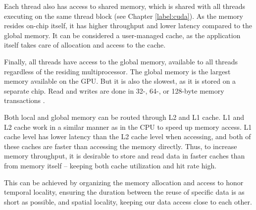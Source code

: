 Each thread also has access to shared memory, which is shared with all threads executing on the same thread block (see Chapter \ref{label:cuda}). As the memory resides on-chip itself, it has higher throughput and lower latency compared to the global memory. It can be considered a user-managed cache, as the application itself takes care of allocation and access to the cache.

Finally, all threads have access to the global memory, available to all threads regardless of the residing multiprocessor. The global memory is the largest memory available on the GPU. But it is also the slowest, as it is stored on a separate chip. Read and writes are done in 32-, 64-, or 128-byte memory transactions \cite{cudaprog}.

Both local and global memory can be routed through L2 and L1 cache. L1 and L2 cache work in a similar manner as in the CPU to speed up memory access. L1 cache level has lower latency than the L2 cache level when accessing, and both of these caches are faster than accessing the memory directly. Thus, to increase memory throughput, it is desirable to store and read data in faster caches than from memory itself -- keeping both cache utilization and hit rate high.

This can be achieved by organizing the memory allocation and access to honor temporal locality, ensuring the duration between the reuse of specific data is as short as possible, and spatial locality, keeping our data access close to each other.

